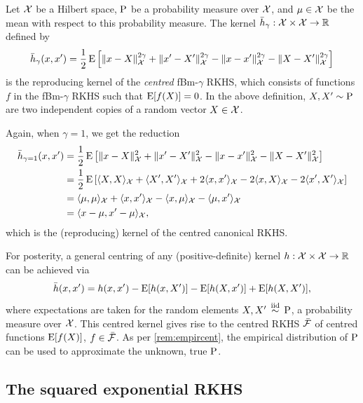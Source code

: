 \begin{definition}
  Let ${\mathcal X}$ be a Hilbert space, $\operatorname{P}$ be a probability measure over ${\mathcal X}$, and $\mu\in{\mathcal X}$ be the mean 
  with respect to this probability measure.
  The kernel $\bar h_\gamma:{\mathcal X}\times{\mathcal X}\to\mathbb{R}$ defined by
  \[
    \bar h_\gamma(x,x') = \frac{1}{2} \operatorname{E} \left[ \lVert x-X\rVert_{\mathcal X}^{2\gamma} + \lVert x'-X'\rVert_{\mathcal X}^{2\gamma} - \lVert x-x'\rVert_{\mathcal X}^{2\gamma} - \lVert X-X'\rVert_{\mathcal X}^{2\gamma} \right]
  \]
  is the reproducing kernel of the \emph{centred} fBm-$\gamma$ RKHS, which consists of functions $f$ in the fBm-$\gamma$ RKHS such that $\operatorname{E} [f(X)] = 0$.
  In the above definition, $X,X' \sim \operatorname{P}$ are two independent copies of a random vector $X \in {\mathcal X}$.
\end{definition}

\begin{remark}
  Again, when $\gamma=1$, we get the reduction 
  \vspace{-0.1em}
  \begin{align*}
    \bar h_{\gamma=1}(x,x') 
    &= \half \E \left[ \norm{x-X}_\cX^{2} + \norm{x'-X'}_\cX^{2} - \norm{x-x'}_\cX^{2} - \norm{X-X'}_\cX^{2} \right] \\
    &= \half \E \left[ \ip{X,X}_\cX + \ip{X',X'}_\cX + 2\ip{x,x'}_\cX - 2\ip{x,X}_\cX - 2\ip{x',X'}_\cX\right] \\
    &= \ip{\mu,\mu}_\cX + \ip{x,x'}_\cX - \ip{x,\mu}_\cX - \ip{\mu,x'}_\cX \\
    &= \ip{x-\mu,x'-\mu}_\cX, \vspace{-1em}
  \end{align*}
  which is the (reproducing) kernel of the centred canonical RKHS.
\end{remark}

\begin{remark}
  For posterity, a general centring of any (positive-definite) kernel $h:{\mathcal X}\times{\mathcal X}\to\mathbb{R}$ can be achieved via
  \[
    \bar h(x,x') = h(x,x') - \operatorname{E}[h(x,X')] - \operatorname{E}[h(X,x')] + \operatorname{E}[h(X,X')],
  \]  
  where expectations are taken for the random elements $X,X'\,\overset{\text{iid}}{\sim}\,\operatorname{P}$, a probability measure over ${\mathcal X}$.
  This centred kernel gives rise to the centred RKHS $\bar{{\mathcal F}}$ of centred functions $\operatorname{E}[f(X)]$, $f\in\bar{{\mathcal F}}$.
  As per \cref{rem:empircent}, the empirical distribution of $\operatorname{P}$ can be used to approximate the unknown, true $\operatorname{P}$.
\end{remark}

\subsection{The squared exponential RKHS}

